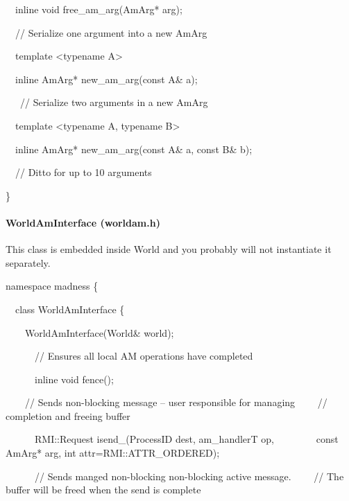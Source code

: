 \documentclass[letterpaper]{article}
\begin{document}
{\ttfamily
\ \ inline void free\_am\_arg(AmArg* arg);}


\bigskip

{\ttfamily
\ \ // Serialize one argument into a new AmArg}

{\ttfamily
\ \ template {\textless}typename A{\textgreater}}

{\ttfamily
\ \ inline AmArg* new\_am\_arg(const A\& a);}


\bigskip

{\ttfamily
\ \ \ // Serialize two arguments in a new AmArg}

{\ttfamily
\ \ template {\textless}typename A, typename B{\textgreater}}

{\ttfamily
\ \ inline AmArg* new\_am\_arg(const A\& a, const B\& b);}


\bigskip

{\ttfamily
\ \ // Ditto for up to 10 arguments}

{\ttfamily
\}}


\bigskip

\paragraph{WorldAmInterface (worldam.h)}
This class is embedded inside World and you probably will not instantiate it separately.

{\ttfamily
namespace madness \{}

{\ttfamily
\ \ class WorldAmInterface \{}

{\ttfamily
\ \ \ \ WorldAmInterface(World\& world);}


\bigskip

{\ttfamily
\ \ \ \ \ \ // Ensures all local AM operations have completed}

{\ttfamily
\ \ \ \ \ \ inline void fence();}


\bigskip

{\ttfamily
\ \ \ \ // Sends non-blocking message -- user responsible for managing\newline
\ \ \ \ // completion and freeing buffer}

{\ttfamily
\ \ \ \ \ \ RMI::Request isend\_(ProcessID dest, am\_handlerT op, \newline
\ \ \ \ \ \ \ \ const AmArg* arg, int attr=RMI::ATTR\_ORDERED);}


\bigskip

{\ttfamily
\ \ \ \ \ \ // Sends manged non-blocking non-blocking active message.\newline
\ \ \ \ // The buffer will be freed when the send is complete}
\end{document}
